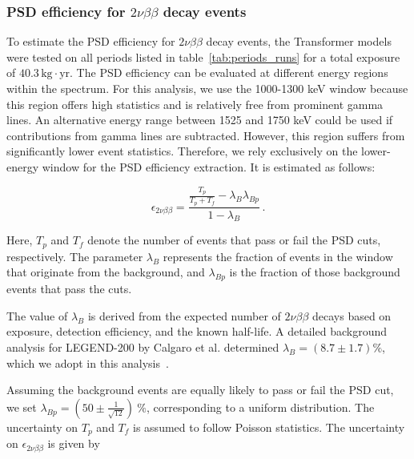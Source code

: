 \subsubsection{PSD efficiency for \texorpdfstring{$2 \nu \beta \beta$}{} decay events}

To estimate the PSD efficiency for $2 \nu \beta \beta$ decay events, the Transformer models were tested on all periods listed in table~\ref{tab:periods_runs} for a total exposure of $40.3\, \mathrm{kg} \cdot \mathrm{yr}$. The PSD efficiency can be evaluated at different energy regions within the spectrum. For this analysis, we use the 1000-1300 keV window because this region offers high statistics and is relatively free from prominent gamma lines.
An alternative energy range between 1525 and 1750 keV could be used if contributions from gamma lines are subtracted. However, this region suffers from significantly lower event statistics. Therefore, we rely exclusively on the lower-energy window for the PSD efficiency extraction. It is estimated as follows:

\begin{equation}
\label{eq:eff_2vbb}
    \epsilon_{2 \nu \beta \beta} = \frac{\frac{T_p}{T_p + T_f} - \lambda_B \lambda_{Bp}}{1 - \lambda_B} \,.
\end{equation}

\noindent Here, $T_p$ and $T_f$ denote the number of events that pass or fail the PSD cuts, respectively. 
The parameter $\lambda_B$ represents the fraction of events in the window that originate from the background, and $\lambda_{Bp}$ is the fraction of those background events that pass the cuts. 

The value of $\lambda_{B}$ is derived from the expected number of $2 \nu \beta \beta$ decays based on exposure, detection efficiency, and the known half-life. A detailed background analysis for LEGEND-200 by Calgaro et al. determined $\lambda_B = (8.7 \pm 1.7) \%$, which we adopt in this analysis~\cite{lnote_24007}. 

Assuming the background events are equally likely to pass or fail the PSD cut, we set $\lambda_{Bp} = (50 \pm \frac{1}{\sqrt{12}})~\% $, corresponding to a uniform distribution. The uncertainty on $T_p$ and $T_f$ is assumed to follow Poisson statistics.
The uncertainty on $\epsilon_{2 \nu \beta \beta}$ is given by

